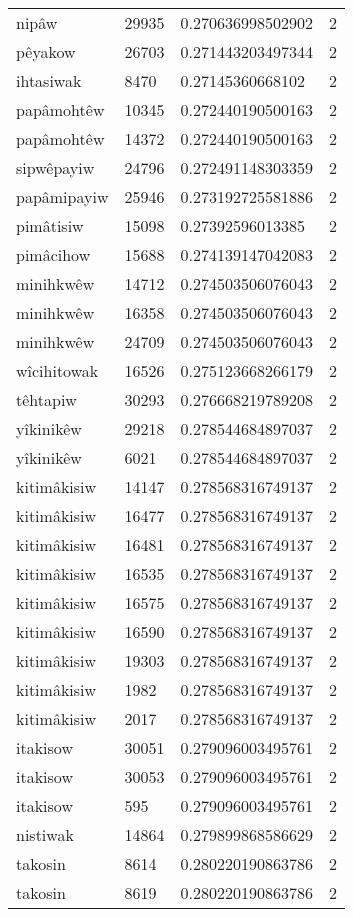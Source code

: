 \begin{longtable}{llll}
nipâw & 29935 & 0.270636998502902 & 2 \\
pêyakow & 26703 & 0.271443203497344 & 2 \\
ihtasiwak & 8470 & 0.27145360668102 & 2 \\
papâmohtêw & 10345 & 0.272440190500163 & 2 \\
papâmohtêw & 14372 & 0.272440190500163 & 2 \\
sipwêpayiw & 24796 & 0.272491148303359 & 2 \\
papâmipayiw & 25946 & 0.273192725581886 & 2 \\
pimâtisiw & 15098 & 0.27392596013385 & 2 \\
pimâcihow & 15688 & 0.274139147042083 & 2 \\
minihkwêw & 14712 & 0.274503506076043 & 2 \\
minihkwêw & 16358 & 0.274503506076043 & 2 \\
minihkwêw & 24709 & 0.274503506076043 & 2 \\
wîcihitowak & 16526 & 0.275123668266179 & 2 \\
têhtapiw & 30293 & 0.276668219789208 & 2 \\
yîkinikêw & 29218 & 0.278544684897037 & 2 \\
yîkinikêw & 6021 & 0.278544684897037 & 2 \\
kitimâkisiw & 14147 & 0.278568316749137 & 2 \\
kitimâkisiw & 16477 & 0.278568316749137 & 2 \\
kitimâkisiw & 16481 & 0.278568316749137 & 2 \\
kitimâkisiw & 16535 & 0.278568316749137 & 2 \\
kitimâkisiw & 16575 & 0.278568316749137 & 2 \\
kitimâkisiw & 16590 & 0.278568316749137 & 2 \\
kitimâkisiw & 19303 & 0.278568316749137 & 2 \\
kitimâkisiw & 1982 & 0.278568316749137 & 2 \\
kitimâkisiw & 2017 & 0.278568316749137 & 2 \\
itakisow & 30051 & 0.279096003495761 & 2 \\
itakisow & 30053 & 0.279096003495761 & 2 \\
itakisow & 595 & 0.279096003495761 & 2 \\
nistiwak & 14864 & 0.279899868586629 & 2 \\
takosin & 8614 & 0.280220190863786 & 2 \\
takosin & 8619 & 0.280220190863786 & 2 \\

\end{longtable}
